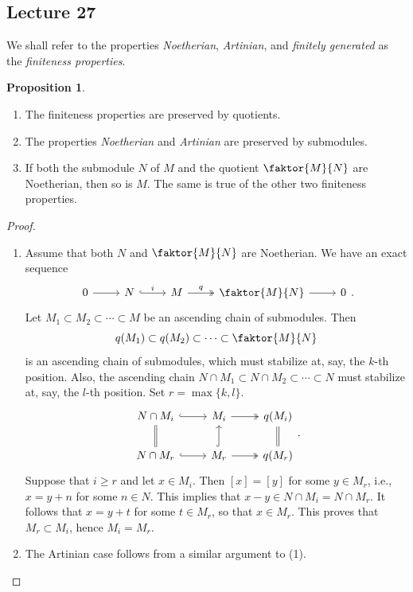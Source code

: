 \documentclass[10pt,letterpaper,cm]{nupset}
\theoremstyle{definition}
\theoremstyle{theorem}
\newtheorem{prop}[definition]{Proposition}
\theoremstyle{remark}
\newcommand{\1}{\mathbf{1}}
\newcommand{\0}{\vec 0}
\begin{document}
\subsection{Lecture 27}

We shall refer to the properties \textit{Noetherian}, \textit{Artinian}, and \textit{finitely generated} as the \textit{finiteness properties}.

\begin{prop} $ $
\begin{enumerate}[label=(\arabic*)]
\item The finiteness properties are preserved by quotients. 
\item The properties \textit{Noetherian} and \textit{Artinian} are preserved by submodules.
\item If both the submodule $N$ of $M$ and the quotient $\faktor{M}{N}$ are Noetherian, then so is $M$. The same is true of the other two finiteness properties.
\end{enumerate}
\begin{proof} $ $
\begin{enumerate}[label=(\arabic*)]
\item Assume that both $N$ and $\faktor{M}{N}$ are Noetherian. We have an exact sequence
\[
\begin{tikzcd}
0 \arrow[r] & N \arrow[r, "i", hook] & M \arrow[r, "q", two heads] & \faktor{M}{N} \arrow[r] & 0
\end{tikzcd}.
\] Let $M_1 \subset M_2 \subset \cdots \subset M$ be an ascending chain of submodules.  Then $$q(M_1) \subset q(M_2) \subset \cdots \subset \faktor{M}{N}$$ is an ascending chain of submodules, which must stabilize at, say, the $k$-th position. Also, the ascending chain $N \cap M_1 \subset N \cap M_2 \subset \cdots \subset N$ must stabilize at, say, the $l$-th position. Set $ r= \max\{k, l\}$.
\[
\begin{tikzcd}
N \cap M_i \arrow[r, hook] & M_i \arrow[r, two heads] & q(M_i) \\
N \cap M_r \arrow[u, equal] \arrow[r, hook] & M_r \arrow[u, hook] \arrow[r, two heads] & q(M_r) \arrow[u, equal]
\end{tikzcd}.
\]
Suppose that $i\geq r$ and let $x \in M_i$. Then $[x] = [y]$ for some $y\in M_r$, i.e., $x = y+n$ for some $n\in N$. This implies that $x-y \in N \cap M_i = N \cap M_r$. It follows that $x = y+t$ for some $t\in M_r$, so that $x\in M_r$. This proves that $M_r\subset M_i$, hence $M_i = M_r$.
\item The Artinian case follows from a similar argument to (1).

\end{enumerate}
\end{proof}
\end{prop}
\end{document}
